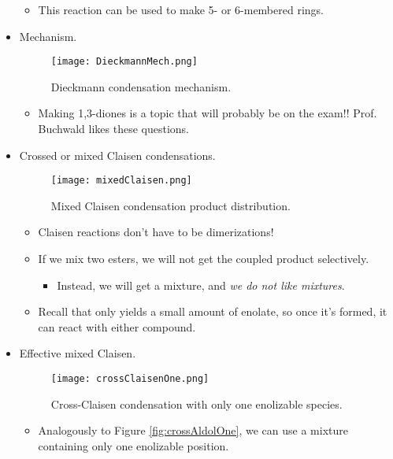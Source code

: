 \documentclass[../notes.tex]{subfiles}
\begin{document}
\begin{itemize}
\begin{itemize}
\begin{itemize}
        \end{itemize}
        \item This reaction can be used to make 5- or 6-membered rings.
    \end{itemize}
    \item Mechanism.
    \begin{figure}[h!]
        \centering
        \texttt{[image: DieckmannMech.png]}
        \caption{Dieckmann condensation mechanism.}
        \label{fig:DieckmannMech}
    \end{figure}
    \begin{itemize}
        \item Making 1,3-diones is a topic that will probably be on the exam!! Prof. Buchwald likes these questions.
    \end{itemize}
    \item Crossed or mixed Claisen condensations.
    \begin{figure}[h!]
        \centering
        \texttt{[image: mixedClaisen.png]}
        \caption{Mixed Claisen condensation product distribution.}
        \label{fig:mixedClaisen}
    \end{figure}
    \pagebreak
    \begin{itemize}
        \item Claisen reactions don't have to be dimerizations!
        \item If we mix two esters, we will not get the coupled product selectively.
        \begin{itemize}
            \item Instead, we will get a mixture, and \emph{we do not like mixtures}.
        \end{itemize}
        \item Recall that  only yields a small amount of enolate, so once it's formed, it can react with either compound.
    \end{itemize}
    \item Effective mixed Claisen.
    \begin{figure}[h!]
        \centering
        \texttt{[image: crossClaisenOne.png]}
        \caption{Cross-Claisen condensation with only one enolizable species.}
        \label{fig:crossClaisenOne}
    \end{figure}
    \begin{itemize}
        \item Analogously to Figure \ref{fig:crossAldolOne}, we can use a mixture containing only one enolizable position.

\end{itemize}
\end{itemize}
\end{document}
